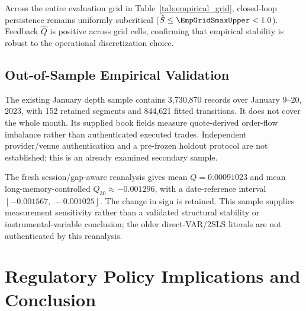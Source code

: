 \documentclass[12pt]{article}
\theoremstyle{definition}
\theoremstyle{remark}
\begin{document}
\begin{table}[htbp]
\centering
\caption{\textbf{Sensitivity of Empirical Feedback Invariants to Sampling Frequency ($\Delta$) and Horizon Window ($W$).}
Estimated persistence $\hat{S}$, feedback parameter $\hat{Q}$, and loop ratio $\hat{\mathcal{L}}$ across sampling intervals $\Delta \in \{1\text{s}, 10\text{s}, 60\text{s}\}$ and moving average window lengths $W \in \{60\text{s}, 300\text{s}, 900\text{s}\}$. Here $a_{\text{EMA}}$ denotes the mechanical filter anchor, distinct from the empirical return autoregression $\hat{J}_{11}$. 95\% confidence intervals in brackets.}
\label{tab:empirical_grid}
\resizebox{\textwidth}{!}{%
%
}
\end{table}

Across the entire evaluation grid in Table~\ref{tab:empirical_grid}, closed-loop persistence remains uniformly subcritical ($\hat{S} \le \EmpGridSmaxUpper < 1.0$). Feedback $\hat{Q}$ is positive across \EmpGridQallPositive{} grid cells, confirming that empirical stability is robust to the operational discretization choice.
\subsection{Out-of-Sample Empirical Validation}
The existing January depth sample contains 3,730,870 records over January 9--20, 2023, with 152 retained segments and 844,621 fitted transitions. It does not cover the whole month. Its supplied book fields measure quote-derived order-flow imbalance rather than authenticated executed trades. Independent provider/venue authentication and a pre-frozen holdout protocol are not established; this is an already examined secondary sample.

The fresh session/gap-aware reanalysis gives mean $Q=0.00091023$ and mean long-memory-controlled $Q_{30}\approx-0.001296$, with a date-reference interval $[-0.001567,\,\allowbreak -0.001025]$. The change in sign is retained. This sample supplies measurement sensitivity rather than a validated structural stability or instrumental-variable conclusion; the older direct-VAR/2SLS literals are not authenticated by this reanalysis.

\section{Regulatory Policy Implications and Conclusion}
\label{sec:policy_conclusion}
\end{document}
